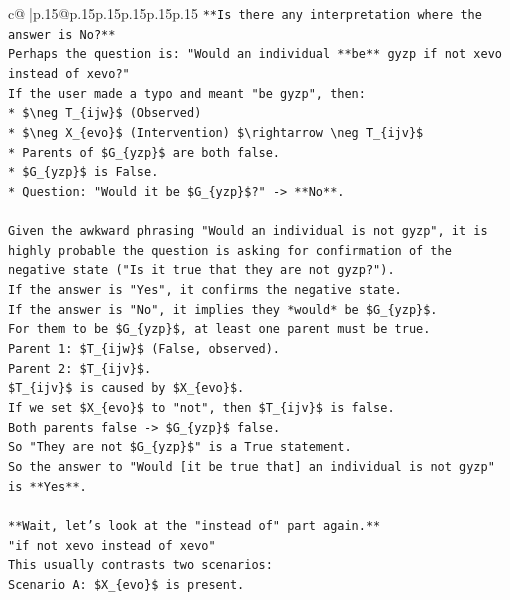 \documentclass{article}
\begin{document}
{\begin{supertabular}{c@{$\;$}|p{.15\linewidth}@{}p{.15\linewidth}p{.15\linewidth}p{.15\linewidth}p{.15\linewidth}p{.15\linewidth}}
{{{\texttt{**Is there any interpretation where the answer is No?**} \\
\texttt{Perhaps the question is: "Would an individual **be** gyzp if not xevo instead of xevo?"} \\
\texttt{If the user made a typo and meant "be gyzp", then:} \\
\texttt{*   \$\textbackslash{}neg T\_\{ijw\}\$ (Observed)} \\
\texttt{*   \$\textbackslash{}neg X\_\{evo\}\$ (Intervention) \$\textbackslash{}rightarrow \textbackslash{}neg T\_\{ijv\}\$} \\
\texttt{*   Parents of \$G\_\{yzp\}\$ are both false.} \\
\texttt{*   \$G\_\{yzp\}\$ is False.} \\
\texttt{*   Question: "Would it be \$G\_\{yzp\}\$?" {-}> **No**.} \\
\\ 
\texttt{Given the awkward phrasing "Would an individual is not gyzp", it is highly probable the question is asking for confirmation of the negative state ("Is it true that they are not gyzp?").} \\
\texttt{If the answer is "Yes", it confirms the negative state.} \\
\texttt{If the answer is "No", it implies they *would* be \$G\_\{yzp\}\$.} \\
\texttt{For them to be \$G\_\{yzp\}\$, at least one parent must be true.} \\
\texttt{Parent 1: \$T\_\{ijw\}\$ (False, observed).} \\
\texttt{Parent 2: \$T\_\{ijv\}\$.} \\
\texttt{\$T\_\{ijv\}\$ is caused by \$X\_\{evo\}\$.} \\
\texttt{If we set \$X\_\{evo\}\$ to "not", then \$T\_\{ijv\}\$ is false.} \\
\texttt{Both parents false {-}> \$G\_\{yzp\}\$ false.} \\
\texttt{So "They are not \$G\_\{yzp\}\$" is a True statement.} \\
\texttt{So the answer to "Would {[}it be true that{]} an individual is not gyzp" is **Yes**.} \\
\\ 
\texttt{**Wait, let's look at the "instead of" part again.**} \\
\texttt{"if not xevo instead of xevo"} \\
\texttt{This usually contrasts two scenarios:} \\
\texttt{Scenario A: \$X\_\{evo\}\$ is present.} \\
}}}
\end{supertabular}}
\end{document}
